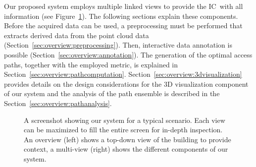 \documentclass[conference,10pt,letter]{IEEEtran}
\def\IC{IC}
\begin{document}

Our proposed system employs multiple linked views to provide the \IC\ with all information (see Figure~\ref{sec:overview:system}). The following sections explain these components. Before the acquired data can be used, a preprocessing must be performed that extracts derived data from the point cloud data (Section~\ref{sec:overview:preprocessing}). Then, interactive data annotation is possible (Section~\ref{sec:overview:annotation}). The generation of the optimal access paths, together with the employed metric, is explained in Section~\ref{sec:overview:pathcomputation}. Section~\ref{sec:overview:3dvisualization} provides details on the design considerations for the 3D visualization component of our system and the analysis of the path ensemble is described in the Section~\ref{sec:overview:pathanalysis}.

\begin{figure}
    \centering
    \caption{A screenshot showing our system for a typical scenario. Each view can be maximized to fill the entire screen for in-depth inspection. An overview (left) shows a top-down view of the building to provide context, a multi-view (right) shows the different components of our system.}
    \label{sec:overview:system}
\end{figure}
\end{document}
